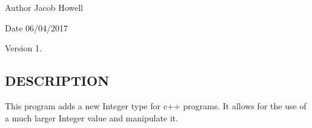 \begin{DoxyAuthor}{Author}
Jacob Howell 
\end{DoxyAuthor}
\begin{DoxyDate}{Date}
06/04/2017 
\end{DoxyDate}
\begin{DoxyVersion}{Version}
1.
\end{DoxyVersion}
\subsection{D\+E\+S\+C\+R\+I\+P\+T\+I\+ON}\label{_big_integer_8cpp_DESCRIPTION}
This program adds a new Integer type for c++ programs. It allows for the use of a much larger Integer value and manipulate it. 